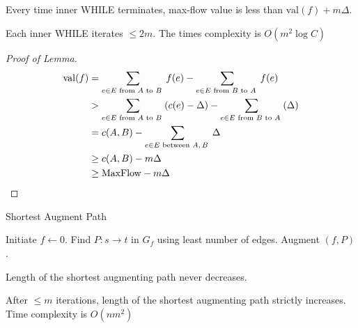 \begin{lemma}
    Every time inner WHILE terminates, max-flow value is less than  $ \mathrm{val}(f)+m\Delta $. 
\end{lemma}

\begin{corollary}
    Each inner WHILE iterates  $  \leq 2m $. The times complexity is  $ O(m^2\log C) $  
\end{corollary}
\begin{proof}[Proof of Lemma]
    \begin{align*}
        \mathrm{val}(f)&=\sum_{e\in E\text{ from $ A $ to  $ B $ }}f(e)-\sum_{e\in E\text{ from  $ B $ to  $ A $ }}f(e)\\
        &>\sum_{e\in E\text{ from $ A $ to  $ B $ }}(c(e)-\Delta)-\sum_{e\in E\text{ from  $ B $ to  $ A $ }}(\Delta)\\
        &=c(A,B)-\sum_{e\in E\text{ between  $ A,B $ }}\Delta\\
        & \geq c(A,B)-m\Delta\\
        & \geq \mathrm{MaxFlow}-m\Delta
    \end{align*}
\end{proof}


\begin{algorithm}
    \caption{Shortest Augment Path}
    \begin{algorithmic}
        \STATE Initiate $ f\leftarrow 0 $.
            \STATE Find  $ P:s\rightarrow t $ in  $ G_f $ using least number of edges.
            \STATE Augment  $ (f,P) $.   
        \ENDWHILE 
    \end{algorithmic}
\end{algorithm}
\begin{lemma}
    Length of the shortest augmenting path never decreases.
\end{lemma}
\begin{lemma}\label{shortest augment path lemma -strongest version}
    After  $   \leq  m$ iterations, length of the shortest augmenting path strictly increases. Time complexity is  $ O(nm^2) $ 
\end{lemma}

